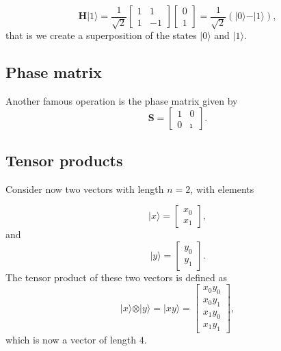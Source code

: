 \[
\bm{H}\vert 1 \rangle = \frac{1}{\sqrt{2}}\begin{bmatrix} 1 & 1 \\ 1 & -1\end{bmatrix}\begin{bmatrix} 0 \\ 1\end{bmatrix}=\frac{1}{\sqrt{2}}(\vert 0\rangle - \vert 1\rangle),
\]
that is we create a superposition of the states $\vert 0\rangle$ and $\vert 1\rangle$.

\subsection{Phase matrix}
Another famous operation is the phase matrix given by
\[
\bm{S} = \begin{bmatrix} 1 & 0 \\ 0 & \imath\end{bmatrix}.
\]

\subsection{Tensor products}

Consider now two vectors with length $n=2$, with elements

\[
\vert x \rangle = \begin{bmatrix} x_0 \\ x_1 \end{bmatrix}, 
\]
and
\[
\vert y \rangle = \begin{bmatrix} y_0 \\ y_1 \end{bmatrix}. 
\]
The tensor product of these two vectors is defined as
\[
\vert x \rangle \otimes \vert y \rangle = \vert xy \rangle  = \begin{bmatrix} x_0y_0 \\ x_0y_1 \\ x_1y_0 \\ x_1y_1 \end{bmatrix}, 
\]
which is now a vector of length $4$.

